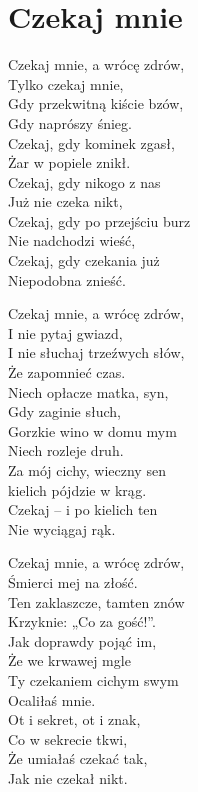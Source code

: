 \section{Czekaj mnie}
\begin{text}
Czekaj mnie, a wrócę zdrów,\\
Tylko czekaj mnie,\\
Gdy przekwitną kiście bzów,\\
Gdy naprószy śnieg.\\
Czekaj, gdy kominek zgasł,\\
Żar w popiele znikł.\\
Czekaj, gdy nikogo z nas\\
Już nie czeka nikt,\\
Czekaj, gdy po przejściu burz\\
Nie nadchodzi wieść,\\
Czekaj, gdy czekania już\\
Niepodobna znieść.

Czekaj mnie, a wrócę zdrów,\\
I nie pytaj gwiazd,\\
I nie słuchaj trzeźwych słów,\\
Że zapomnieć czas.\\
Niech opłacze matka, syn,\\
Gdy zaginie słuch,\\
Gorzkie wino w domu mym\\
Niech rozleje druh.\\
Za mój cichy, wieczny sen\\
kielich pójdzie w krąg.\\
Czekaj – i po kielich ten\\
Nie wyciągaj rąk.

Czekaj mnie, a wrócę zdrów,\\
Śmierci mej na złość.\\
Ten zaklaszcze, tamten znów\\
Krzyknie: „Co za gość!”.\\
Jak doprawdy pojąć im,\\
Że we krwawej mgle\\
Ty czekaniem cichym swym\\
Ocaliłaś mnie.\\
Ot i sekret, ot i znak,\\
Co w sekrecie tkwi,\\
Że umiałaś czekać tak,\\
Jak nie czekał nikt.
\end{text}